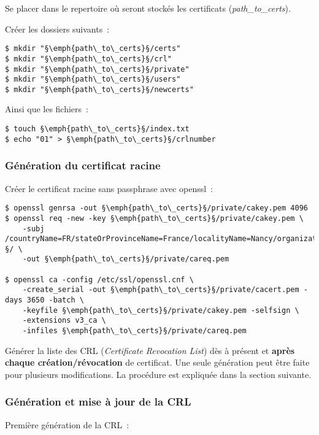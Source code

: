 Se placer dans le repertoire où seront stockés les certificats (\emph{path\_to\_certs}).

Créer les dossiers suivants~:

\begin{lstlisting}
$ mkdir "§\emph{path\_to\_certs}§/certs"
$ mkdir "§\emph{path\_to\_certs}§/crl"
$ mkdir "§\emph{path\_to\_certs}§/private"
$ mkdir "§\emph{path\_to\_certs}§/users"
$ mkdir "§\emph{path\_to\_certs}§/newcerts"
\end{lstlisting}

Ainsi que les fichiers~:

\begin{lstlisting}
$ touch §\emph{path\_to\_certs}§/index.txt
$ echo "01" > §\emph{path\_to\_certs}§/crlnumber
\end{lstlisting}

\subsubsection{Génération du certificat racine}

Créer le certificat racine sans passphrase avec openssl~:

\begin{lstlisting}
$ openssl genrsa -out §\emph{path\_to\_certs}§/private/cakey.pem 4096 
$ openssl req -new -key §\emph{path\_to\_certs}§/private/cakey.pem \
	-subj /countryName=FR/stateOrProvinceName=France/localityName=Nancy/organizationName=BHConsulting/commonName=§\emph{Nom\_de\_la\_société\_cliente}§/ \
	-out §\emph{path\_to\_certs}§/private/careq.pem

$ openssl ca -config /etc/ssl/openssl.cnf \
	-create_serial -out §\emph{path\_to\_certs}§/private/cacert.pem -days 3650 -batch \
	-keyfile §\emph{path\_to\_certs}§/private/cakey.pem -selfsign \
	-extensions v3_ca \
	-infiles §\emph{path\_to\_certs}§/private/careq.pem
\end{lstlisting}

Générer la liste des CRL (\emph{Certificate Revocation List}) dès à présent et \textbf{après chaque création/révocation} de certificat. Une seule génération peut être faite pour plusieurs modifications. La procédure est expliquée dans la section suivante.

\subsubsection{Génération et mise à jour de la CRL}

Première génération de la CRL~:

